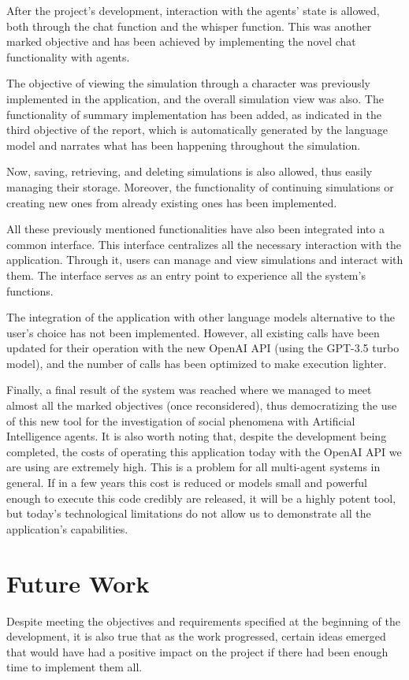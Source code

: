 After the project's development, interaction with the agents' state is allowed, both through the chat function and the whisper function. This was another marked objective and has been achieved by implementing the novel chat functionality with agents.

The objective of viewing the simulation through a character was previously implemented in the application, and the overall simulation view was also. The functionality of summary implementation has been added, as indicated in the third objective of the report, which is automatically generated by the language model and narrates what has been happening throughout the simulation.

Now, saving, retrieving, and deleting simulations is also allowed, thus easily managing their storage. Moreover, the functionality of continuing simulations or creating new ones from already existing ones has been implemented.

All these previously mentioned functionalities have also been integrated into a common interface. This interface centralizes all the necessary interaction with the application. Through it, users can manage and view simulations and interact with them. The interface serves as an entry point to experience all the system's functions.

The integration of the application with other language models alternative to the user's choice has not been implemented. However, all existing calls have been updated for their operation with the new OpenAI API (using the GPT-3.5 turbo model), and the number of calls has been optimized to make execution lighter.

Finally, a final result of the system was reached where we managed to meet almost all the marked objectives (once reconsidered), thus democratizing the use of this new tool for the investigation of social phenomena with Artificial Intelligence agents. It is also worth noting that, despite the development being completed, the costs of operating this application today with the OpenAI API we are using are extremely high. This is a problem for all multi-agent systems in general. If in a few years this cost is reduced or models small and powerful enough to execute this code credibly are released, it will be a highly potent tool, but today's technological limitations do not allow us to demonstrate all the application's capabilities.

\section{Future Work}
Despite meeting the objectives and requirements specified at the beginning of the development, it is also true that as the work progressed, certain ideas emerged that would have had a positive impact on the project if there had been enough time to implement them all.


